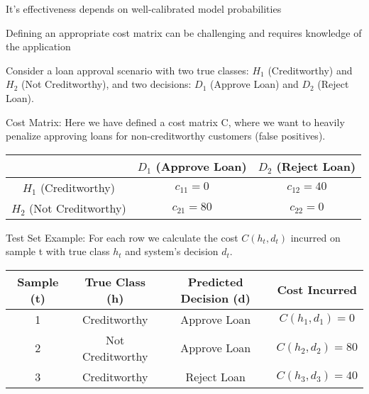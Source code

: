 {
\item It's effectiveness depends on well-calibrated model probabilities 
\item Defining an appropriate cost matrix can be challenging and requires knowledge of the application 
}


\clearpage
\thispagestyle{classificationstyle}

Consider a loan approval scenario with two true classes: $H_1$ (Creditworthy) and $H_2$ (Not Creditworthy), and two decisions: $D_1$ (Approve Loan) and $D_2$ (Reject Loan).

Cost Matrix: Here we have defined a cost matrix C, where we want to heavily penalize approving loans for non-creditworthy customers (false positives).

\begin{center}
\begin{tabular}{|c|c|c|}
\hline
 & $D_1$ (Approve Loan) & $D_2$ (Reject Loan) \\
\hline
$H_1$ (Creditworthy) & $c_{11} =  0$ & $c_{12} = 40$ \\
\hline
$H_2$ (Not Creditworthy) & $c_{21} = 80$ & $c_{22} =  0$ \\
\hline
\end{tabular}
\end{center}

Test Set Example: For each row we calculate the cost $C(h_t, d_t)$ incurred on sample t with true class $h_t$ and system’s decision $d_t$.

\begin{center}
\begin{tabular}{|c|c|c|c|}
\hline
Sample (t)& True Class (h) & Predicted Decision (d) & Cost Incurred \\
\hline
1 & Creditworthy & Approve Loan & $C(h_1, d_1) = 0$ \\
\hline
2 & Not Creditworthy & Approve Loan & $C(h_2, d_2) = 80$ \\
\hline
3 & Creditworthy & Reject Loan & $C(h_3, d_3) = 40$ \\
\hline
\end{tabular}
\end{center}

